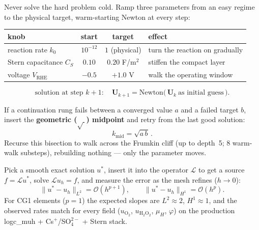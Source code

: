 \documentclass[11pt]{article}
\newcommand{\VRHE}{V_{\mathrm{RHE}}}
\newcommand{\CS}{C_{S}}
\begin{document}
\begin{tcolorbox}[cardstyle={Slide 15 --- Continuation: deform easy $\to$ hard along three knobs}]
Never solve the hard problem cold. Ramp three parameters from an easy
regime to the physical target, warm-starting Newton at every step:
\begin{center}
\begin{tabular}{lccl}
\hline
\textbf{knob} & \textbf{start} & \textbf{target} & \textbf{effect}\\
\hline
reaction rate $k_0$        & $10^{-12}$ & $1$ (physical)        & turn the reaction on gradually\\
Stern capacitance $\CS$    & $0.10$     & $0.20$ F/m$^2$        & stiffen the compact layer\\
voltage $\VRHE$            & $-0.5$     & $+1.0$ V              & walk the operating window\\
\hline
\end{tabular}
\end{center}
\[
  \text{solution at step } k+1:\quad
  \mathbf{U}_{k+1} = \text{Newton}\big(\,\mathbf{U}_{k}\ \text{as initial guess}\,\big).
\]
\end{tcolorbox}

\begin{tcolorbox}[cardstyle={Slide 16 --- When a step fails: recover, don't restart}]
If a continuation rung fails between a converged value $a$ and a failed
target $b$, insert the \textbf{geometric ($\sqrt{\ }$) midpoint} and
retry from the last good solution:
\[
  k_{\mathrm{mid}} = \sqrt{a\,b}\,.
\]
Recurse this bisection to walk across the Frumkin cliff (up to depth~5;
8 warm-walk substeps), rebuilding nothing --- only the parameter moves.
\end{tcolorbox}

\begin{tcolorbox}[cardstyle={Slide 17 --- Verification: method of manufactured solutions}]
Pick a smooth exact solution $u^\ast$, insert it into the operator
$\mathcal{L}$ to get a source $f=\mathcal{L}u^\ast$, solve
$\mathcal{L}u_h=f$, and measure the error as the mesh refines ($h\to0$):
\[
  \|u^\ast - u_h\|_{L^2} = \mathcal{O}(h^{p+1}),
  \qquad
  \|u^\ast - u_h\|_{H^1} = \mathcal{O}(h^{p}).
\]
For CG1 elements ($p=1$) the expected slopes are $L^2\approx 2$,
$H^1\approx 1$, and the observed rates match for every field
($u_{\mathrm{O_2}}$, $u_{\mathrm{H_2O_2}}$, $\mu_H$, $\varphi$) on the
production logc\_muh + Cs$^+$/SO$_4^{2-}$ + Stern stack.
\end{tcolorbox}
\end{document}
